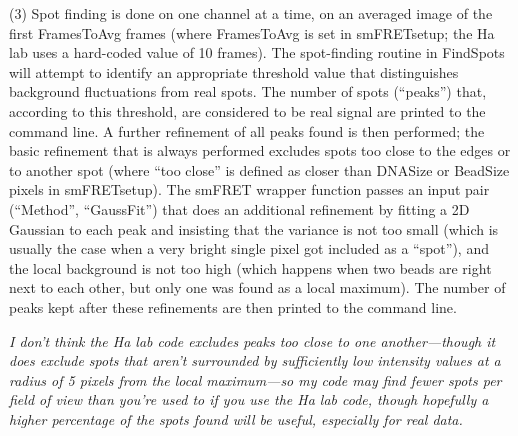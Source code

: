\documentclass[11pt]{article}
\begin{document}
\noindent (3) Spot finding is done on one channel at a time, on an averaged image of the first FramesToAvg frames (where FramesToAvg is set in smFRETsetup; the Ha lab uses a hard-coded value of 10 frames). The spot-finding routine in FindSpots will attempt to identify an appropriate threshold value that distinguishes background fluctuations from real spots. The number of spots (``peaks'') that, according to this threshold, are considered to be real signal are printed to the command line. A further refinement of all peaks found is then performed; the basic refinement that is always performed excludes spots too close to the edges or to another spot (where ``too close'' is defined as closer than DNASize or BeadSize pixels in smFRETsetup). The smFRET wrapper function passes an input pair (``Method'', ``GaussFit'') that does an additional refinement by fitting a 2D Gaussian to each peak and insisting that the variance is not too small (which is usually the case when a very bright single pixel got included as a ``spot''), and the local background is not too high (which happens when two beads are right next to each other, but only one was found as a local maximum). The number of peaks kept after these refinements are then printed to the command line.

{\it I don't think the Ha lab code excludes peaks too close to one another---though it does exclude spots that aren't surrounded by sufficiently low intensity values at a radius of 5 pixels from the local maximum---so my code may find fewer spots per field of view than you're used to if you use the Ha lab code, though hopefully a higher percentage of the spots found will be useful, especially for real data.}\\
\end{document}
